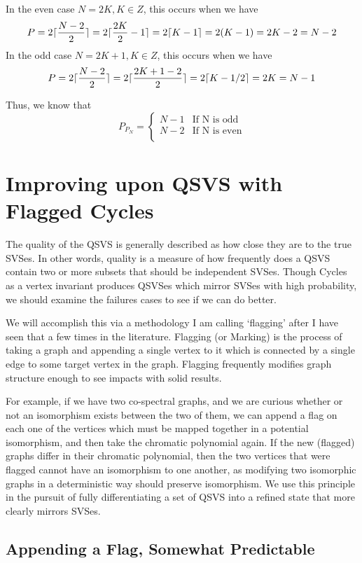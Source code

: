In the even case $N = 2K, K \in Z$, this occurs when we have 
$$P = 2\lceil\frac{N-2}{2}\rceil = 2\lceil\frac{2K}{2} - 1\rceil = 2\lceil K - 1\rceil = 2(K - 1) = 2K - 2 = N - 2$$
In the odd case $N = 2K +1, K \in Z$, this occurs when we have 
$$P = 2\lceil\frac{N-2}{2}\rceil  = 2\lceil\frac{2K+1- 2}{2}\rceil = 2\lceil K - 1/2\rceil = 2K = N - 1 $$

Thus, we know that 
\[ P_{P_N} = \begin{cases} 
      N-1 & \text{If N is odd} \\
      N-2 & \text{If N is even} \\
   \end{cases}
\]

\section{Improving upon QSVS with Flagged Cycles}

The quality of the QSVS is generally described as how close they are to the true SVSes.
In other words, quality is a measure of how frequently does a QSVS contain two or more subsets that should be independent SVSes.
Though Cycles as a vertex invariant produces QSVSes which mirror SVSes with high probability, we should examine the failures cases to see if we can do better.

We will accomplish this via a methodology I am calling `flagging' after I have seen that a few times in the literature.
Flagging (or Marking) is the process of taking a graph and appending a single vertex to it which is connected by a single edge to some target vertex in the graph.
Flagging frequently modifies graph structure enough to see impacts with solid results.

For example, if we have two co-spectral graphs, and we are curious whether or not an isomorphism exists between the two of them, we can append a flag on each one of the vertices which must be mapped together in a potential isomorphism, and then take the chromatic polynomial again.
If the new (flagged) graphs differ in their chromatic polynomial, then the two vertices that were flagged cannot have an isomorphism to one another, as modifying two isomorphic graphs in a deterministic way should preserve isomorphism.
We use this principle in the pursuit of fully differentiating a set of QSVS into a refined state that more clearly mirrors SVSes.

\subsection{Appending a Flag, Somewhat Predictable}

